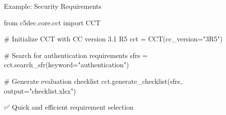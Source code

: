 \documentclass[
  11pt,
  ignorenonframetext,
  aspectratio=169,
]{beamer}
\newenvironment{Shaded}{\begin{snugshade}}{\end{snugshade}}
\newcommand{\CommentTok}[1]{\textcolor[rgb]{0.37,0.37,0.37}{#1}}
\newcommand{\ImportTok}[1]{\textcolor[rgb]{0.00,0.46,0.62}{#1}}
\newcommand{\NormalTok}[1]{\textcolor[rgb]{0.00,0.23,0.31}{#1}}
\newcommand{\OperatorTok}[1]{\textcolor[rgb]{0.37,0.37,0.37}{#1}}
\newcommand{\StringTok}[1]{\textcolor[rgb]{0.13,0.47,0.30}{#1}}
\begin{document}
\begin{frame}[fragile]{Example: Security Requirements}
\label{example-security-requirements}
\begin{Shaded}
\begin{Highlighting}[]
\ImportTok{from}\NormalTok{ c5dec.core.cct }\ImportTok{import}\NormalTok{ CCT}

\CommentTok{\# Initialize CCT with CC version 3.1 R5}
\NormalTok{cct }\OperatorTok{=}\NormalTok{ CCT(cc\_version}\OperatorTok{=}\StringTok{"3R5"}\NormalTok{)}

\CommentTok{\# Search for authentication requirements}
\NormalTok{sfrs }\OperatorTok{=}\NormalTok{ cct.search\_sfr(keyword}\OperatorTok{=}\StringTok{"authentication"}\NormalTok{)}

\CommentTok{\# Generate evaluation checklist}
\NormalTok{cct.generate\_checklist(sfrs, output}\OperatorTok{=}\StringTok{"checklist.xlsx"}\NormalTok{)}
\end{Highlighting}
\end{Shaded}

✅ Quick and efficient requirement selection
\end{frame}
\end{document}
